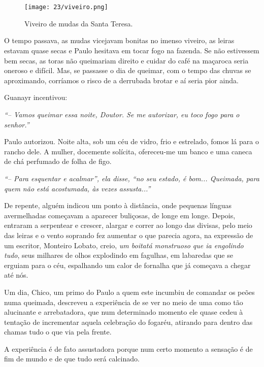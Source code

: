 \chapter{}

\begin{figure}
\centering
\texttt{[image: 23/viveiro.png]}
\caption{Viveiro de mudas da Santa Teresa.}
\end{figure}

O tempo passava, as mudas vicejavam bonitas no imenso viveiro, as leiras estavam quase secas e Paulo hesitava em tocar fogo na fazenda.
Se não estivessem bem secas, as toras não queimariam direito e cuidar do café na maçaroca seria oneroso e difícil.
Mas, se passasse o dia de queimar, com o tempo das chuvas se aproximando, corríamos o risco de a derrubada brotar e aí seria pior ainda.

Guanayr incentivou:

\textit{``-- Vamos queimar essa noite, Doutor.
Se me autorizar, eu toco fogo para o senhor.'' }

Paulo autorizou.
Noite alta, sob um céu de vidro, frio e estrelado, fomos lá para o rancho dele.
A mulher, docemente solícita, ofereceu-me um banco e uma caneca de chá perfumado de folha de figo.

\textit{``-- Para esquentar e acalmar'', ela disse, ``no seu estado, é bom...
Queimada, para quem não está acostumada, às vezes assusta...'' }

De repente, alguém indicou um ponto à distância, onde pequenas línguas avermelhadas começavam a aparecer buliçosas, de longe em longe.
Depois, entraram a serpentear e crescer, alargar e correr ao longo das divisas, pelo meio das leiras e o vento soprando fez aumentar o que parecia agora, na expressão de um escritor, Monteiro Lobato, creio, \textit{um boitatá monstruoso que ia engolindo tudo}, seus milhares de olhos explodindo em fagulhas, em labaredas que se erguiam para o céu, espalhando um calor de fornalha que já começava a chegar até nós.

Um dia, Chico, um primo do Paulo a quem este incumbiu de comandar os peões numa queimada, descreveu a experiência de se ver no meio de uma como tão alucinante e arrebatadora, que num determinado momento ele quase cedeu à tentação de incrementar aquela celebração do fogaréu, atirando para dentro das chamas tudo o que via pela frente.

A experiência é de fato assustadora porque num certo momento a sensação é de fim de mundo e de que tudo será calcinado.

